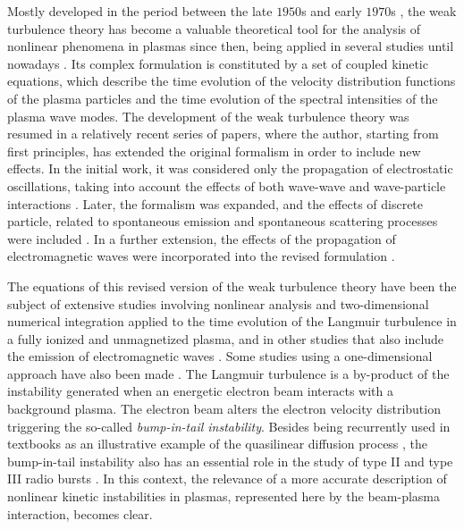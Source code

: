 \documentclass[12pt,a4paper,ruledheader]{report}
\begin{document}
Mostly developed in the period between the late $1950$s and early
$1970$s \cite{Kadomtsev1965,Tsytovich1967,saggal,tsynlep,david,
  tsyitotp,akhi2,tsytotp,mel}, the weak turbulence theory has
become a valuable theoretical tool for the analysis of nonlinear
phenomena in plasmas since then, being applied in several studies
until nowadays \cite{Grognard1982,McClements87b,Hanssen1991,
  Edney2001,Kontar2001,Kontar2002,THD13}. Its complex formulation
is constituted by a set of coupled kinetic equations, which describe
the time evolution of the velocity distribution functions of the
plasma particles and the time evolution of the spectral intensities of
the plasma wave modes. The development of the weak turbulence theory
was resumed in a relatively recent series of papers, where the author,
starting from first principles, has extended the original formalism in
order to include new effects. In the initial work, it was considered
only the propagation of electrostatic oscillations, taking into account
the effects of both wave-wave and wave-particle interactions \cite{Yoon00}.
Later, the formalism was expanded, and the effects of discrete particle,
related to spontaneous emission and spontaneous scattering processes
were included \cite{Yoon05a}. In a further extension, the effects of
the propagation of electromagnetic waves were incorporated into the
revised formulation \cite{Yoon06,Yoon2012b}.

The equations of this revised version of the weak turbulence theory
have been the subject of extensive studies involving nonlinear analysis
and two-dimensional numerical integration applied to the time evolution
of the Langmuir turbulence \cite{ZGPY08,Ziebell2012,YZGLW12,
  ZYGP14a,ZYGP14b} in a fully ionized and unmagnetized plasma, and in
other studies that also include the emission of electromagnetic waves
\cite{ZYSGP14c,ZYPGP15,ZPYGP16}. Some studies using a one-dimensional
approach have also been made \cite{ZiebellGY01,GaelzerZY02,GZVYR08}.
The Langmuir turbulence is a by-product  of the instability generated
when an energetic electron beam interacts with a background plasma. The
electron beam alters the electron velocity distribution triggering the
so-called \emph{bump-in-tail instability}. Besides being recurrently used
in textbooks as an illustrative example of the quasilinear diffusion process
\cite{akhi2,chen,gurnett2017}, the bump-in-tail instability also has an
essential role in the study of type II and type III radio bursts
\cite{Emslie1984,Hannah2009,ZVST11,Hannah2011,KK12,RR14,BNKR14}. In this
context, the relevance of a more accurate description of nonlinear kinetic
instabilities in plasmas, represented here by the beam-plasma interaction,
becomes clear.
\end{document}
